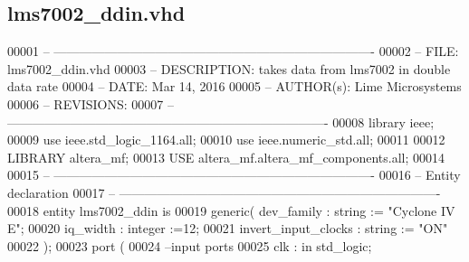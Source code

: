 \subsection{lms7002\+\_\+ddin.\+vhd}
\label{rx__modules_2lms7002__ddin_8vhd_source}

\begin{DoxyCode}
00001 \textcolor{keyword}{-- ---------------------------------------------------------------------------- }
00002 \textcolor{keyword}{-- FILE:    lms7002\_ddin.vhd}
00003 \textcolor{keyword}{-- DESCRIPTION: takes data from lms7002 in double data rate}
00004 \textcolor{keyword}{-- DATE:    Mar 14, 2016}
00005 \textcolor{keyword}{-- AUTHOR(s):   Lime Microsystems}
00006 \textcolor{keyword}{-- REVISIONS:}
00007 \textcolor{keyword}{-- ---------------------------------------------------------------------------- }
00008 \textcolor{vhdlkeyword}{library }\textcolor{keywordflow}{ieee};
00009 \textcolor{vhdlkeyword}{use }ieee.std\_logic\_1164.\textcolor{keywordflow}{all};
00010 \textcolor{vhdlkeyword}{use }ieee.numeric\_std.\textcolor{keywordflow}{all};
00011 
00012 \textcolor{vhdlkeyword}{LIBRARY }\textcolor{keywordflow}{altera\_mf};
00013 \textcolor{vhdlkeyword}{USE }altera_mf.altera\_mf\_components.\textcolor{keywordflow}{all};
00014 
00015 \textcolor{keyword}{-- ----------------------------------------------------------------------------}
00016 \textcolor{keyword}{-- Entity declaration}
00017 \textcolor{keyword}{-- ----------------------------------------------------------------------------}
00018 \textcolor{keywordflow}{entity }lms7002_ddin \textcolor{keywordflow}{is}
00019     \textcolor{keywordflow}{generic}\textcolor{vhdlchar}{(} \textcolor{vhdlchar}{dev_family}             \textcolor{vhdlchar}{:} \textcolor{comment}{string} \textcolor{vhdlchar}{:=} \textcolor{keyword}{"Cyclone IV E"};
00020                 \textcolor{vhdlchar}{iq_width}                    \textcolor{vhdlchar}{:} \textcolor{comment}{integer} \textcolor{vhdlchar}{:=}\textcolor{vhdllogic}{}\textcolor{vhdllogic}{12};
00021                 \textcolor{vhdlchar}{invert_input_clocks} \textcolor{vhdlchar}{:} \textcolor{comment}{string} \textcolor{vhdlchar}{:=} \textcolor{keyword}{"ON"}
00022     \textcolor{vhdlchar}{)};
00023     \textcolor{keywordflow}{port} \textcolor{vhdlchar}{(}
00024 \textcolor{keyword}{      --input ports }
00025       \textcolor{vhdlchar}{clk}           \textcolor{vhdlchar}{:} \textcolor{keywordflow}{in} \textcolor{comment}{std\_logic};

\end{DoxyCode}
